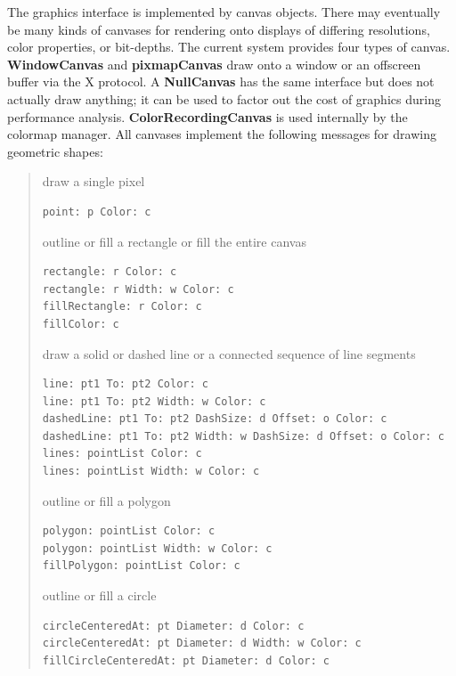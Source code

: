 \documentclass[letterpaper,10pt,english]{sphinxmanual}
\begin{document}
The graphics interface is implemented by canvas objects. There may eventually be many kinds of canvases for rendering onto displays of differing resolutions, color properties, or bit-depths. The current system provides four types of canvas. \textbf{WindowCanvas} and \textbf{pixmapCanvas} draw onto a window or an offscreen buffer via the X protocol. A \textbf{NullCanvas} has the same interface but does not actually draw anything; it can be used to factor out the cost of graphics during performance analysis. \textbf{ColorRecordingCanvas} is used internally by the colormap manager. All canvases implement the following messages for drawing geometric shapes:
\begin{quote}

draw a single pixel

\begin{Verbatim}[commandchars=\\\{\}]
point: p Color: c
\end{Verbatim}

outline or fill a rectangle or fill the entire canvas

\begin{Verbatim}[commandchars=\\\{\}]
rectangle: r Color: c
rectangle: r Width: w Color: c
fillRectangle: r Color: c
fillColor: c
\end{Verbatim}

draw a solid or dashed line or a connected sequence of line segments

\begin{Verbatim}[commandchars=\\\{\}]
line: pt1 To: pt2 Color: c
line: pt1 To: pt2 Width: w Color: c
dashedLine: pt1 To: pt2 DashSize: d Offset: o Color: c
dashedLine: pt1 To: pt2 Width: w DashSize: d Offset: o Color: c
lines: pointList Color: c
lines: pointList Width: w Color: c
\end{Verbatim}

outline or fill a polygon

\begin{Verbatim}[commandchars=\\\{\}]
polygon: pointList Color: c
polygon: pointList Width: w Color: c
fillPolygon: pointList Color: c
\end{Verbatim}

outline or fill a circle

\begin{Verbatim}[commandchars=\\\{\}]
circleCenteredAt: pt Diameter: d Color: c
circleCenteredAt: pt Diameter: d Width: w Color: c
fillCircleCenteredAt: pt Diameter: d Color: c
\end{Verbatim}


\end{quote}
\end{document}
